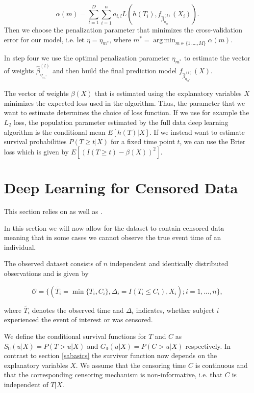 \documentclass[12pt, a4paper]{scrartcl}
\theoremstyle{definition}
\theoremstyle{plain}
\numberwithin{equation}{section}
\numberwithin{figure}{section}
\numberwithin{table}{section}
\DeclareMathOperator*{\argmin}{arg\,min}
\begin{document}
	\begin{equation*}
	 \alpha(m) = \sum_{l=1}^D \sum_{i=1}^n a_{i,l} L(h(T_i), f_{\hat{\beta}_{\eta_m}^{(l)}}(X_i)).
 	\end{equation*}
 	Then we choose the penalization parameter that minimizes the cross-validation error for our model, i.e. let $\eta = \eta_{m^*}$, where $m^* = \argmin_{m \in \{1,\dots,M\}} \alpha(m)$.
 	
 	In step four we use the optimal penalization parameter $\eta_{m^*}$ to estimate the vector of weights $\hat{\beta}_{\eta_{m^*}}^{(l)}$ and then build the final prediction model $f_{\hat{\beta}_{\eta_{m^*}}^{(l)}}(X)$.
 	
 	The vector of weights $\beta(X)$ that is estimated using the explanatory variables $X$ minimizes the expected loss used in the algorithm.
 	Thus, the parameter that we want to estimate determines the choice of loss function.
 	If we use for example the $L_2$ loss, the population parameter estimated by the full data deep learning algorithm is the conditional mean $E[h(T) \vert X]$.
 	If we instead want to estimate survival probabilities $P(T\geq t \vert X )$ for a fixed time point $t$, we can use the Brier loss which is given by $E[(I(T\geq t)-\beta(X))^2]$.
 	
	\newpage
	\section{Deep Learning for Censored Data} \label{censored}
	
	This section relies on \citet*{basearticle} as well as \citet*{deeplbook}.
	
	In this section we will now allow for the dataset to contain censored data meaning that in some cases we cannot observe the true event time of an individual.
	
	The observed dataset consists of $n$ independent and identically distributed observations and is given by 
	
	\begin{equation*}
	\mathcal{O} = \{(\tilde{T_i} = \min \{T_i, C_i\}, \Delta_i = I(T_i \leq C_i), X_i); i = 1,\dots,n\},
	\end{equation*}
	 
	 where $\tilde{T_i}$ denotes the observed time and $\Delta_i$ indicates, whether subject $i$ experienced the event of interest or was censored.
	 
	 We define the conditional survival functions for $T$ and $C$ as $S_0(u \vert X)=P(T>u \vert X)$ and $G_0(u \vert X)=P(C>u \vert X)$ respectively.
	 In contrast to section \ref{sabasics} the survivor function now depends on the explanatory variables $X$.
	 We assume that the censoring time $C$ is continuous and that the corresponding censoring mechanism is non-informative, i.e. that $C$ is independent of $T\vert X$.
	 
\end{document}

